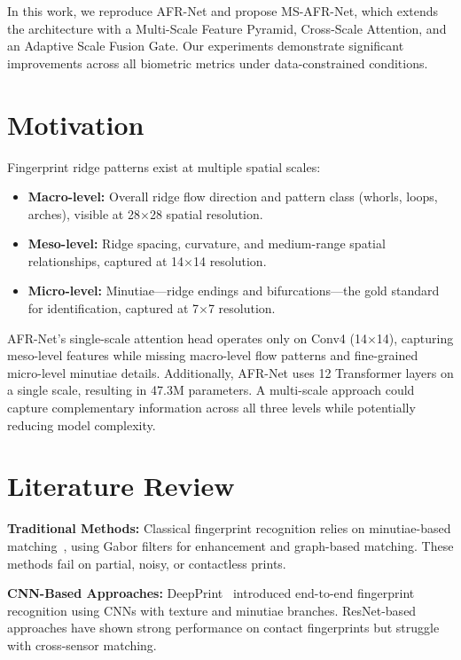 \documentclass[conference]{IEEEtran}
\begin{document}
In this work, we reproduce AFR-Net and propose MS-AFR-Net, which extends the architecture with a Multi-Scale Feature Pyramid, Cross-Scale Attention, and an Adaptive Scale Fusion Gate. Our experiments demonstrate significant improvements across all biometric metrics under data-constrained conditions.

\section{Motivation}

Fingerprint ridge patterns exist at multiple spatial scales:
\begin{itemize}
    \item \textbf{Macro-level:} Overall ridge flow direction and pattern class (whorls, loops, arches), visible at 28$\times$28 spatial resolution.
    \item \textbf{Meso-level:} Ridge spacing, curvature, and medium-range spatial relationships, captured at 14$\times$14 resolution.
    \item \textbf{Micro-level:} Minutiae---ridge endings and bifurcations---the gold standard for identification, captured at 7$\times$7 resolution.
\end{itemize}

AFR-Net's single-scale attention head operates only on Conv4 (14$\times$14), capturing meso-level features while missing macro-level flow patterns and fine-grained micro-level minutiae details. Additionally, AFR-Net uses 12 Transformer layers on a single scale, resulting in 47.3M parameters. A multi-scale approach could capture complementary information across all three levels while potentially reducing model complexity.

\section{Literature Review}

\textbf{Traditional Methods:} Classical fingerprint recognition relies on minutiae-based matching~\cite{maltoni2009handbook}, using Gabor filters for enhancement and graph-based matching. These methods fail on partial, noisy, or contactless prints.

\textbf{CNN-Based Approaches:} DeepPrint~\cite{deepprint} introduced end-to-end fingerprint recognition using CNNs with texture and minutiae branches. ResNet-based approaches have shown strong performance on contact fingerprints but struggle with cross-sensor matching.
\end{document}
